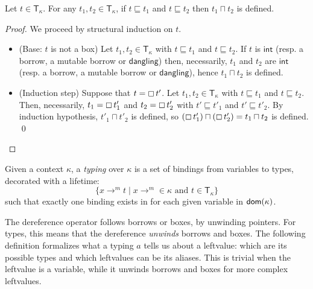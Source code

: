 \begin{lemma}\label{lemma:technical-type}
  Let $t\in\mathsf{T}_\kappa$. For any $t_1,t_2\in\mathsf{T}_\kappa$,
  if $t\sqsubseteq t_1$ and $t\sqsubseteq t_2$ then $t_1\sqcap t_2$ is defined.
\end{lemma}
\begin{proof}
  We proceed by structural induction on $t$.
  \begin{itemize}
    \item (Base: $t$ is not a box)
    Let $t_1,t_2\in\mathsf{T}_\kappa$ with $t\sqsubseteq t_1$ and $t\sqsubseteq t_2$.
    If $t$ is $\mathsf{int}$ (resp. a borrow, a mutable borrow or $\mathsf{dangling}$)
    then, necessarily, $t_1$ and $t_2$ are $\mathsf{int}$ (resp. a borrow,
    a mutable borrow or $\mathsf{dangling}$), hence $t_1\sqcap t_2$ is defined.
    \item (Induction step) Suppose that $t = \boxempty\,{t'}$.
    Let $t_1,t_2\in\mathsf{T}_\kappa$ with $t\sqsubseteq t_1$ and $t\sqsubseteq t_2$.
    Then, necessarily, $t_1 = \boxempty\,{t'_1}$ and $t_2 = \boxempty\,{t'_2}$
    with $t'\sqsubseteq t'_1$ and $t'\sqsubseteq t'_2$. By induction
    hypothesis, $t'_1\sqcap t'_2$ is defined, so
    $(\boxempty\,{t'_1}) \sqcap (\boxempty\,{t'_2}) = t_1 \sqcap t_2$ is defined.
    \qed
  \end{itemize}
\end{proof}

\begin{definition}[Typing]\label{def:typing}
  Given a context $\kappa$, a \emph{typing} over $\kappa$ is
  a set of bindings from variables to types, decorated with a lifetime:
  \[
  \{x\to^m t\mid x\to^m\in\kappa\text{ and }t\in\mathsf{T_\kappa}\}
  \]
  such that exactly one binding exists in for each given variable in $\mathsf{dom}(\kappa)$.
\end{definition}

The dereference operator follows borrows or boxes, by unwinding pointers.
For types, this means that the dereference \emph{unwinds} borrows and boxes.
The following definition formalizes what a typing $a$ tells us about
a leftvalue: which are its possible types and which leftvalues can be its aliases.
This is trivial when the leftvalue is a variable,
while it unwinds borrows and boxes for more complex leftvalues.

